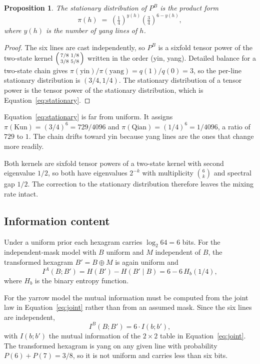 \documentclass[11pt,a4paper]{article}
\newtheorem{proposition}[theorem]{Proposition}
\newcommand{\xor}{\oplus}
\begin{document}
\begin{proposition}
\label{prop:stationary}
The stationary distribution of $P^{B}$ is the product form
\begin{equation}
\pi(h) \;=\; \left(\tfrac{1}{4}\right)^{y(h)} \left(\tfrac{3}{4}\right)^{6-y(h)},
\label{eq:stationary}
\end{equation}
where $y(h)$ is the number of yang lines of $h$.
\end{proposition}

\begin{proof}
The six lines are cast independently, so $P^{B}$ is a sixfold tensor power of the
two-state kernel $\begin{psmallmatrix} 7/8 & 1/8 \\ 3/8 & 5/8 \end{psmallmatrix}$
written in the order (yin, yang). Detailed balance for a two-state chain gives
$\pi(\text{yin}) / \pi(\text{yang}) = q(1)/q(0) = 3$, so the per-line stationary
distribution is $(3/4, 1/4)$. The stationary distribution of a tensor power is
the tensor power of the stationary distribution, which is
Equation~\eqref{eq:stationary}.
\end{proof}

Equation~\eqref{eq:stationary} is far from uniform. It assigns
$\pi(\text{Kun}) = (3/4)^6 = 729/4096$ and
$\pi(\text{Qian}) = (1/4)^6 = 1/4096$, a ratio of $729$ to $1$. The chain drifts
toward yin because yang lines are the ones that change more readily.

Both kernels are sixfold tensor powers of a two-state kernel with second
eigenvalue $1/2$, so both have eigenvalues $2^{-k}$ with multiplicity
$\binom{6}{k}$ and spectral gap $1/2$. The correction to the stationary
distribution therefore leaves the mixing rate intact.

\subsection{Information content}

Under a uniform prior each hexagram carries $\log_2 64 = 6$ bits. For the
independent-mask model with $B$ uniform and $M$ independent of $B$, the
transformed hexagram $B' = B \xor M$ is again uniform and
\begin{equation}
I^{A}(B;B') = H(B') - H(B' \mid B) = 6 - 6\,H_b(1/4),
\label{eq:miA}
\end{equation}
where $H_b$ is the binary entropy function.

For the yarrow model the mutual information must be computed from the joint law
in Equation~\eqref{eq:joint} rather than from an assumed mask. Since the six
lines are independent,
\begin{equation}
I^{B}(B;B') = 6 \cdot I(b; b'),
\label{eq:miB}
\end{equation}
with $I(b;b')$ the mutual information of the $2 \times 2$ table in
Equation~\eqref{eq:joint}. The transformed hexagram is yang on any given line
with probability $P(6) + P(7) = 3/8$, so it is not uniform and carries less than
six bits.
\end{document}
